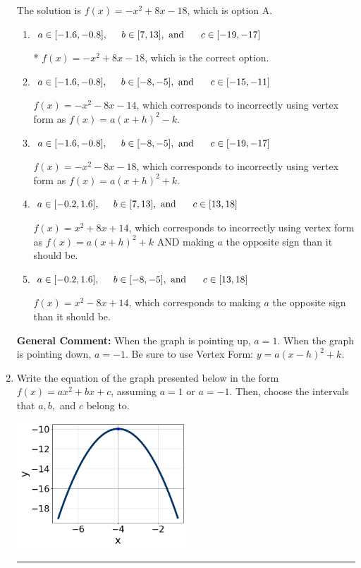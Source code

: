 \documentclass{extbook}[14pt]
\newcommand{\litem}[1]{\item #1

\rule{\textwidth}{0.4pt}}
\begin{document}
\begin{enumerate}
{The solution is \( f(x) = -x^{2} +8 x -18 \), which is option A.\begin{enumerate}[label=\Alph*.]
\item \( a \in [-1.6, -0.8], \hspace*{5mm} b \in [7, 13], \text{ and } \hspace*{5mm} c \in [-19, -17] \)

* $f(x)=-x^{2} +8 x -18$, which is the correct option.
\item \( a \in [-1.6, -0.8], \hspace*{5mm} b \in [-8, -5], \text{ and } \hspace*{5mm} c \in [-15, -11] \)

$f(x)=-x^{2} -8 x -14$, which corresponds to incorrectly using vertex form as $f(x) = a(x+h)^2 - k$.
\item \( a \in [-1.6, -0.8], \hspace*{5mm} b \in [-8, -5], \text{ and } \hspace*{5mm} c \in [-19, -17] \)

$f(x)=-x^{2} -8 x -18$, which corresponds to incorrectly using vertex form as $f(x) = a(x+h)^2+k$.
\item \( a \in [-0.2, 1.6], \hspace*{5mm} b \in [7, 13], \text{ and } \hspace*{5mm} c \in [13, 18] \)

$f(x)=x^{2} +8 x + 14$, which corresponds to incorrectly using vertex form as $f(x) = a(x+h)^2+k$ AND making $a$ the opposite sign than it should be.
\item \( a \in [-0.2, 1.6], \hspace*{5mm} b \in [-8, -5], \text{ and } \hspace*{5mm} c \in [13, 18] \)

$f(x)=x^{2} -8 x + 14$, which corresponds to making $a$ the opposite sign than it should be.
\end{enumerate}

\textbf{General Comment:} When the graph is pointing up, $a=1$. When the graph is pointing down, $a=-1$. Be sure to use Vertex Form: $y = a(x-h)^2+k$.
}
\litem{
Write the equation of the graph presented below in the form $f(x)=ax^2+bx+c$, assuming  $a=1$ or $a=-1$. Then, choose the intervals that $a, b,$ and $c$ belong to.

\begin{center}
    \includegraphics[width=0.5\textwidth]{../Figures/quadraticGraphToEquationCopyA.png}
\end{center}


}
\end{enumerate}
\end{document}
